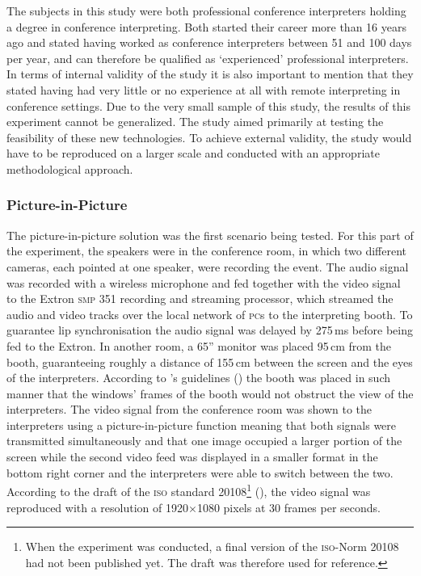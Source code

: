 \documentclass[output=paper]{langsci/langscibook}
\begin{document}
The subjects in this study were both professional conference interpreters holding a degree in conference interpreting. Both started their career more than 16 years ago and stated having worked as conference interpreters between 51 and 100 days per year, and can therefore be qualified as ‘experienced’ professional interpreters. In terms of internal validity of the study it is also important to mention that they stated having had very little or no experience at all with remote interpreting in conference settings. Due to the very small sample of this study, the results of this experiment cannot be generalized. The study aimed primarily at testing the feasibility of these new technologies. To achieve external validity, the study would have to be reproduced on a larger scale and conducted with an appropriate methodological approach.

\subsubsection{Picture-in-Picture} 

The picture-in-picture solution was the first scenario being tested. For this part of the experiment, the speakers were in the conference room, in which two different cameras, each pointed at one speaker, were recording the event. The audio signal was recorded with a wireless microphone and fed together with the video signal to the Extron \textsc{smp 351} recording and streaming processor, which streamed the audio and video tracks over the local network of \textsc{pc}s to the interpreting booth. To guarantee lip synchronisation the audio signal was delayed by 275\,ms before being fed to the Extron. In another room, a 65” monitor was placed 95\,cm from the booth, guaranteeing roughly a distance of 155\,cm between the screen and the eyes of the interpreters. According to \citeauthor{Causo2011}’s guidelines (\citeyear[2]{Causo2011}) the booth was placed in such manner that the windows’ frames of the booth would not obstruct the view of the interpreters. The video signal from the conference room was shown to the interpreters using a picture-in-picture function meaning that both signals were transmitted simultaneously and that one image occupied a larger portion of the screen while the second video feed was displayed in a smaller format in the bottom right corner and the interpreters were able to switch between the two. According to the draft of the \textsc{iso} standard 20108\footnote{When the experiment was conducted, a final version of the \textsc{iso}-Norm 20108 had not been published yet. The draft was therefore used for reference.} (\citeyear[6]{ISO20108}), the video signal was reproduced with a resolution of 1920$\times$1080 pixels at 30 frames per seconds. 
\end{document}
